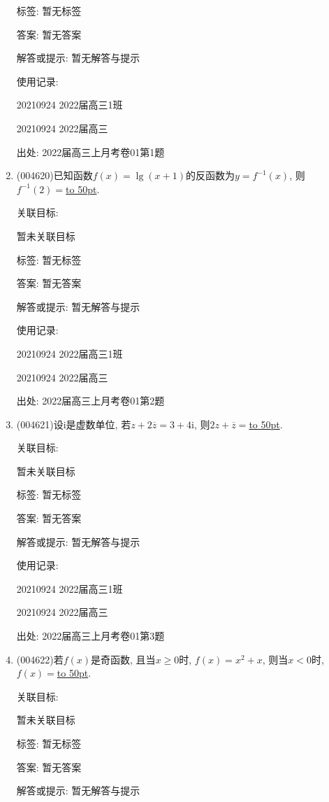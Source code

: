 \documentclass[10pt,a4paper]{article}
\newcommand{\blank}[1]{\underline{\hbox to #1pt{}}}
\begin{document}
\begin{enumerate}[1.]
标签: 暂无标签

答案: 暂无答案

解答或提示: 暂无解答与提示

使用记录:

20210924	2022届高三1班	

20210924	2022届高三	


出处: 2022届高三上月考卷01第1题
\item { (004620)}已知函数$f(x)=\lg (x+1)$的反函数为$y=f^{-1}(x)$, 则$f^{-1}(2)=$\blank{50}.


关联目标:

暂未关联目标



标签: 暂无标签

答案: 暂无答案

解答或提示: 暂无解答与提示

使用记录:

20210924	2022届高三1班	

20210924	2022届高三	


出处: 2022届高三上月考卷01第2题
\item { (004621)}设$\mathrm{i}$是虚数单位, 若$z+2\overline z=3+4\mathrm{i}$, 则$2z+\overline z=$\blank{50}.


关联目标:

暂未关联目标



标签: 暂无标签

答案: 暂无答案

解答或提示: 暂无解答与提示

使用记录:

20210924	2022届高三1班	

20210924	2022届高三	


出处: 2022届高三上月考卷01第3题
\item { (004622)}若$f(x)$是奇函数, 且当$x\ge 0$时, $f(x)=x^2+x$, 则当$x<0$时, $f(x)=$\blank{50}.


关联目标:

暂未关联目标



标签: 暂无标签

答案: 暂无答案

解答或提示: 暂无解答与提示


\end{enumerate}
\end{document}
